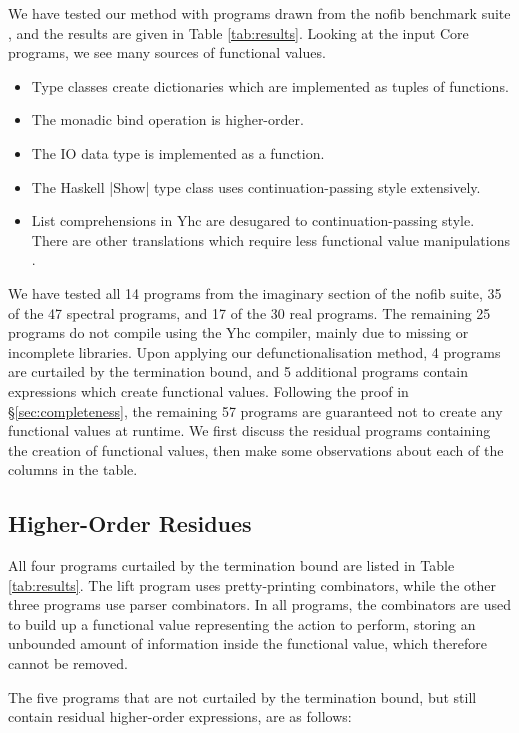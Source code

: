 \documentclass[preprint]{sigplanconf}
\begin{document}
We have tested our method with programs drawn from the nofib benchmark suite \cite{nofib}, and the results are given in Table \ref{tab:results}. Looking at the input Core programs, we see many sources of functional values.

\begin{itemize}
\item Type classes create dictionaries which are implemented as tuples of functions.
\item The monadic bind operation is higher-order.
\item The IO data type is implemented as a function.
\item The Haskell |Show| type class uses continuation-passing style extensively.
\item List comprehensions in Yhc are desugared to continuation-passing style. There are other translations which require less functional value manipulations \cite{coutts:stream_fusion}.
\end{itemize}

We have tested all 14 programs from the imaginary section of the nofib suite, 35 of the 47 spectral programs, and 17 of the 30 real programs. The remaining 25 programs do not compile using the Yhc compiler, mainly due to missing or incomplete libraries. Upon applying our defunctionalisation method, 4 programs are curtailed by the termination bound, and 5 additional programs contain expressions which create functional values. Following the proof in \S\ref{sec:completeness}, the remaining 57 programs are guaranteed not to create any functional values at runtime. We first discuss the residual programs containing the creation of functional values, then make some observations about each of the columns in the table.

\subsection{Higher-Order Residues}

All four programs curtailed by the termination bound are listed in Table \ref{tab:results}. The lift program uses pretty-printing combinators, while the other three programs use parser combinators. In all programs, the combinators are used to build up a functional value representing the action to perform, storing an unbounded amount of information inside the functional value, which therefore cannot be removed.

The five programs that are not curtailed by the termination bound, but still contain residual higher-order expressions, are as follows:
\end{document}
